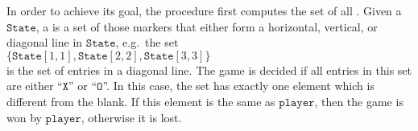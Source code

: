 \begin{enumerate}
      In order to achieve its goal, the procedure first computes the set of all .
      Given a $\texttt{State}$, a  is a set of those markers that either form a horizontal,
      vertical, or diagonal line in $\texttt{State}$, e.g.~the set 
      \\[0.2cm]
      \hspace*{1.3cm}
      $\{ \texttt{State}[1,1], \texttt{State}[2,2], \texttt{State}[3,3] \}$
      \\[0.2cm]
      is the set of entries in a diagonal line.  The game is decided if all entries in this set are either
      ``$\texttt{X}$'' or ``$\texttt{O}$''.  In this case, the set has exactly one element which is different
      from the blank.  If this element is the same as $\texttt{player}$, then the game is won by
      $\texttt{player}$, otherwise it is lost.


\end{enumerate}
